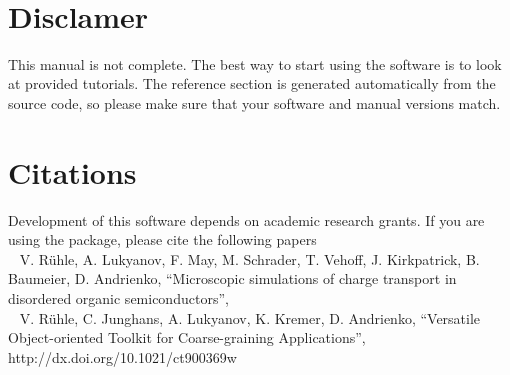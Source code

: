 \begin{titlepage}


\vspace*{1cm}

\vspace*{3cm}
\vspace*{1cm}

\vfill
\center{\large{\today}} \\
\end{titlepage}

\section*{Disclamer}
This manual is not complete. The best way to start using the software is to look at provided tutorials. The reference section is generated automatically from the source code, so please make sure that your software and manual versions match.  

\section*{Citations}
Development of this software depends on academic research grants. If you are using the package, please cite the  following papers \\

\vspace{0.1cm}
\noindent
~\cite{ruehle_microscopic_2011} V. R\"uhle, A. Lukyanov, F. May, M. Schrader, T. Vehoff, J. Kirkpatrick, B. Baumeier, D. Andrienko,
``Microscopic simulations of charge transport in disordered organic semiconductors'',  \\

\vspace{0.1cm}
\noindent
~\cite{ruehle_versatile_2009} V. R\"uhle, C. Junghans, A. Lukyanov, K. Kremer, D. Andrienko, 
``Versatile Object-oriented Toolkit for Coarse-graining Applications'',
{http://dx.doi.org/10.1021/ct900369w}


